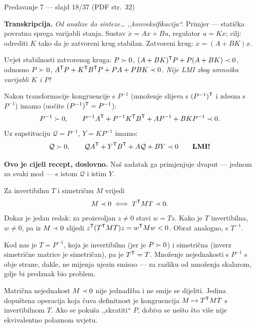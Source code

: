 \begin{izvor}{Predavanje 7 --- slajd 18/37 (PDF str.~32)}

\textbf{Transkripcija.} \emph{Od analize do sinteze\dots{} ,,konveksifikacija``.}
Primjer --- statička povratna sprega varijabli stanja. Sustav
$\dot{x} = Ax + Bu$, regulator $u = Kx$; cilj: odrediti $K$ tako da je zatvoreni
krug stabilan. Zatvoreni krug: $\dot{x} = (A + BK)x$.

Uvjet stabilnosti zatvorenog kruga:
$P \succ 0$, $(A+BK)^{\mathsf{T}} P + P(A+BK) \prec 0$, odnosno
$P \succ 0$, $A^{\mathsf{T}} P + K^{\mathsf{T}} B^{\mathsf{T}} P + PA + PBK \prec 0$.
\emph{Nije LMI zbog umnoška varijabli $K$ i $P$!}

Nakon transformacije kongruencije s $P^{-1}$ (množenje slijeva s $(P^{-1})^{\mathsf{T}}$
i zdesna s $P^{-1}$) imamo (uočite $(P^{-1})^{\mathsf{T}} = P^{-1}$):
\[
P^{-1} \succ 0, \qquad P^{-1}A^{\mathsf{T}} + P^{-1}K^{\mathsf{T}} B^{\mathsf{T}} + AP^{-1} + BKP^{-1} \prec 0 .
\]
Uz supstituciju $\mathcal{Q} = P^{-1}$, $Y = KP^{-1}$ imamo:
\[
\mathcal{Q} \succ 0, \qquad \mathcal{Q}A^{\mathsf{T}} + Y^{\mathsf{T}} B^{\mathsf{T}} + A\mathcal{Q} + BY \prec 0
\qquad \textbf{LMI!}
\]

\textbf{Ovo je cijeli recept, doslovno.} Naš zadatak ga primjenjuje dvaput ---
jednom za svaki mod --- s istom $\mathcal{Q}$ i istim $Y$.
\end{izvor}

\begin{korak}
Za invertibilnu $T$ i simetričnu $M$ vrijedi
\begin{equation}
M \prec 0 \iff T^{\mathsf{T}} M T \prec 0 .
\end{equation}
Dokaz je jedan redak: za proizvoljan $z \neq 0$ stavi $w = Tz$. Kako je $T$
invertibilna, $w \neq 0$, pa iz $M \prec 0$ slijedi
$z^{\mathsf{T}} (T^{\mathsf{T}} M T) z = w^{\mathsf{T}} M w < 0$. Obrat analogno, s $T^{-1}$.

Kod nas je $T = P^{-1}$, koja je invertibilna (jer je $P \succ 0$) i simetrična
(inverz simetrične matrice je simetričan), pa je $T^{\mathsf{T}} = T$. Množenje
nejednakosti s $P^{-1}$ s obje strane, dakle, ne mijenja njezin smisao --- za
razliku od množenja skalarom, gdje bi predznak bio problem.
\end{korak}

\begin{zamka}
Matrična nejednakost $M \prec 0$ nije jednadžba i ne smije se dijeliti. Jedina
dopuštena operacija koja čuva definitnost je kongruencija $M \mapsto T^{\mathsf{T}} M T$
s invertibilnom $T$. Ako se pokuša ,,skratiti`` $P$, dobiva se nešto što više
nije ekvivalentno polaznom uvjetu.
\end{zamka}

